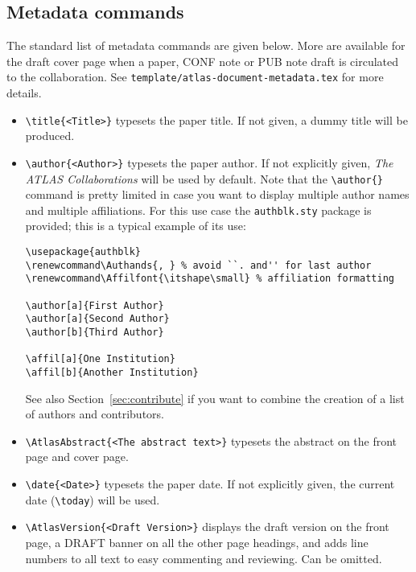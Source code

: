 \documentclass[koma,UKenglish]{style/atlasdoc}
\begin{document}
\subsection{Metadata commands}

The standard list of metadata commands are given below.
More are available for the draft cover page when a paper, CONF note or PUB note draft
is circulated to the collaboration.
See \texttt{template/atlas-document-metadata.tex} for more details.

\begin{itemize}
  \item {\verb|\title{<Title>}|} typesets the paper title. If not
    given, a dummy title will be produced.

  \item {\verb|\author{<Author>}|} typesets the paper author. If not
    explicitly given, \emph{The ATLAS Collaborations} will be used by
    default. Note that the \verb|\author{}| command is pretty limited
    in case you want to display multiple author names and multiple
    affiliations. For this use case the \verb|authblk.sty| package is
    provided; this is a typical example of its use:
    \begin{verbatim}
\usepackage{authblk}
\renewcommand\Authands{, } % avoid ``. and'' for last author
\renewcommand\Affilfont{\itshape\small} % affiliation formatting

\author[a]{First Author}
\author[a]{Second Author}
\author[b]{Third Author}

\affil[a]{One Institution}
\affil[b]{Another Institution}
    \end{verbatim}
    See also Section~\ref{sec:contribute} if you want to combine the creation of a list of authors and contributors.

  \item {\verb|\AtlasAbstract{<The abstract text>}|} typesets the
    abstract on the front page and cover page.

  \item {\verb|\date{<Date>}|} typesets the paper date. If not
    explicitly given, the current date (\verb|\today|) will be used.

  \item {\verb|\AtlasVersion{<Draft Version>}|} displays the draft
    version on the front page, a DRAFT banner on all the other page
    headings, and adds line numbers to all text to easy commenting and
    reviewing. Can be omitted.


\end{itemize}
\end{document}
